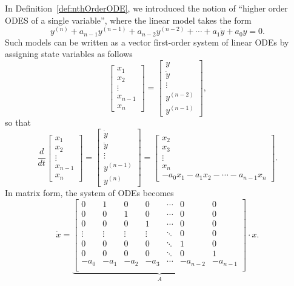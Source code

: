 In Definition~\ref{def:nthOrderODE}, we introduced the notion of ``higher order ODES of a single variable'', where the linear model takes the form
$$
   y^{(n)} + a_{n-1} y^{(n-1)} + a_{n-2} y^{(n-2)} +  \cdots +  a_1 \dot{y} + a_0 y = 0.
$$
Such models can be written as a vector first-order system of linear ODEs by assigning state variables as follows
\begin{equation}
    \left[ \begin{array}{c} x_1 \\ x_2 \\ \vdots\\ x_{n-1} \\ x_n \end{array} \right] =  \left[ \begin{array}{c} y \\ \dot{y} \\ \vdots\\ y^{(n-2)} \\ y^{(n-1)} \end{array} \right],
\end{equation}
 so that
 \begin{equation}
    \frac{d}{dt} \left[ \begin{array}{c} x_1 \\ x_2 \\ \vdots\\ x_{n-1} \\ x_n \end{array} \right] =  \left[ \begin{array}{c} \dot{y} \\ \ddot{y} \\ \vdots\\ y^{(n-1)}  \\ y^{(n)} \end{array} \right] = \left[ \begin{array}{c} x_2\\ x_3 \\ \vdots\\ x_n  \\ -a_0 x_1 - a_1 x_2 - \cdots - a_{n-1}x_n\end{array} \right].
\end{equation}
In matrix form, the system of ODEs becomes 
\begin{equation}
    \dot{x} = \underbrace{ \left[ \begin{array}{ccccccc} 
    0 & 1 & 0 & 0 &\cdots & 0  & 0 \\
     0 & 0 & 1 & 0 &\cdots & 0  & 0 \\
    0 & 0 & 0 & 1 &\cdots & 0  & 0 \\
    \vdots & \vdots & \vdots & \vdots &\ddots & 0  & 0 \\
 0 & 0 & 0 & 0 &\ddots & 1  & 0 \\
 0 & 0 & 0 & 0 &\ddots  & 0 & 1 \\
     -a_0 & -a_1 & -a_2 & -a_3 &\cdots& -a_{n-2} & -a_{n-1} \\
    \end{array} \right]}_{A} \cdot x.
\end{equation}

